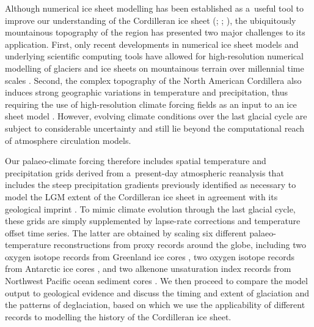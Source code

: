 \documentclass[tc, manuscript]{copernicus}
\begin{document}
      Although numerical ice sheet modelling has been established as
      a~useful tool to improve our understanding of the Cordilleran ice sheet
      (\citealp[p.~227]{Jackson.Clague.1991}; \citealp{Robert.1991};
      \citealp{Marshall.etal.2000}), the ubiquitously mountainous topography
      of the region has presented two major challenges to its application.
      First, only recent developments in numerical ice sheet models and
      underlying scientific computing tools \citep{Bueler.Brown.2009,
      Balay.etal.2015} have allowed for high-resolution numerical modelling
      of glaciers and ice sheets on mountainous terrain over millennial time
      scales \citep[e.g.,][]{Golledge.etal.2012}. Second, the complex
      topography of the North American Cordillera also induces strong
      geographic variations in temperature and precipitation, thus requiring
      the use of high-resolution climate forcing fields as an input to an
      ice sheet model \citep{Seguinot.etal.2014}. However, evolving climate
      conditions over the last glacial cycle are subject to considerable
      uncertainty and still lie beyond the computational reach of atmosphere
      circulation models.

      Our palaeo-climate forcing therefore includes spatial temperature and
      precipitation grids derived from a~present-day atmospheric reanalysis
      \citep{Mesinger.etal.2006} that includes the steep precipitation
      gradients previously identified as necessary to model the LGM extent
      of the Cordilleran ice sheet in agreement with its geological imprint
      \citep{Seguinot.etal.2014}. To mimic climate evolution through the
      last glacial cycle, these grids are simply supplemented by lapse-rate
      corrections and temperature offset time series. The latter are
      obtained by scaling six different palaeo-temperature reconstructions
      from proxy records around the globe, including two oxygen isotope
      records from Greenland ice cores \citep{Dansgaard.etal.1993,
      Andersen.etal.2004}, two oxygen isotope records from Antarctic ice
      cores \citep{Petit.etal.1999,Jouzel.etal.2007}, and two alkenone
      unsaturation index records from Northwest Pacific ocean sediment cores
      \citep{Herbert.etal.2001}. We then proceed to compare the model output
      to geological evidence and discuss the timing and extent of glaciation
      and the patterns of deglaciation, based on which we use the
      applicability of different records to modelling the history of the
      Cordilleran ice sheet.
\end{document}
